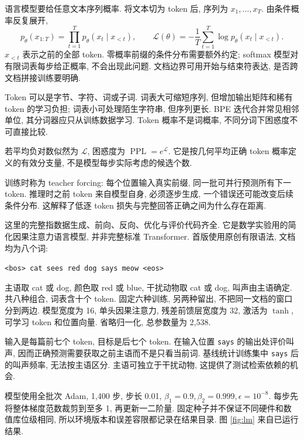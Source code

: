 \label{ch:lm}
语言模型要给任意文本序列概率. 将文本切为 token 后, 序列为 $x_1,\ldots,x_T$. 由条件概率反复展开,
\[
p_\theta(x_{1:T})=\prod_{t=1}^T p_\theta(x_t\mid x_{<t}),\qquad
\mathcal L(\theta)=-\frac1T\sum_{t=1}^T\log p_\theta(x_t\mid x_{<t}).
\]
$x_{<t}$ 表示之前的全部 token. 零概率前缀的条件分布需要额外约定; softmax 模型对有限词表每步给正概率, 不会出现此问题. 文档边界可用开始与结束符表达, 是否跨文档拼接训练要明确.

Token 可以是字节、字符、词或子词. 词表大可缩短序列, 但增加输出矩阵和稀有 token 的学习负担; 词表小可处理陌生字符串, 但序列更长. BPE 迭代合并常见相邻单位, 其分词器应只从训练数据学习. Token 概率不是词概率, 不同分词下困惑度不可直接比较.

\begin{definition}
若平均负对数似然为 $\mathcal L$, 困惑度为 $\operatorname{PPL}=e^{\mathcal L}$. 它是按几何平均正确 token 概率定义的有效分支量, 不是模型每步实际考虑的候选个数.
\end{definition}
训练时称为 teacher forcing: 每个位置输入真实前缀, 同一批可并行预测所有下一 token. 推理时之前 token 来自模型自身, 必须逐步生成, 一个错误还可能改变后续条件分布. 这解释了低逐 token 损失与完整回答正确之间为什么存在距离.

这里的完整指数据生成、前向、反向、优化与评价代码齐全. 它是数学实验用的简化因果注意力语言模型, 并非完整标准 Transformer.
首版使用原创有限语法, 文档均为八个词:
\begin{center}\texttt{<bos> cat sees red dog says meow <eos>}\end{center}
主语取 cat 或 dog, 颜色取 red 或 blue, 干扰动物取 cat 或 dog, 叫声由主语确定. 共八种组合, 词表含十个 token. 固定六种训练, 另两种留出, 不把同一文档的窗口分到两边. 模型宽度为 16, 单头因果注意力, 残差前馈层宽度为 32, 激活为 $\tanh$, 可学习 token 和位置向量. 省略归一化, 总参数量为 2,538.

输入是每篇前七个 token, 目标是后七个 token. 在输入位置 \texttt{says} 的输出处评价叫声, 因而正确预测需要获取之前主语而不是只看当前词. 基线统计训练集中 \texttt{says} 后的叫声频率, 无法按主语区分. 主语可独立于干扰动物, 这提供了测试检索依赖的机会.

模型使用全批次 Adam, 1,400 步, 步长 0.01, $\beta_1=0.9,\beta_2=0.999,\epsilon=10^{-8}$. 每步先将整体梯度范数裁剪到至多 1, 再更新一二阶量. 固定种子并不保证不同硬件和数值库位级相同, 所以环境版本和误差容限都记录在结果目录. 图 \ref{fig:lm} 来自已运行结果.
\par

